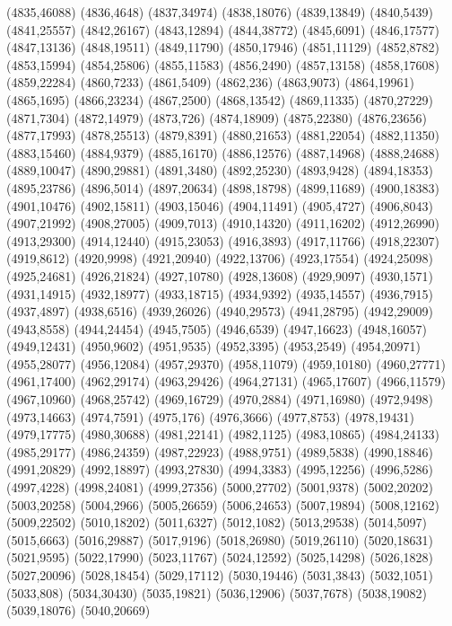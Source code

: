 (4835,46088)
(4836,4648)
(4837,34974)
(4838,18076)
(4839,13849)
(4840,5439)
(4841,25557)
(4842,26167)
(4843,12894)
(4844,38772)
(4845,6091)
(4846,17577)
(4847,13136)
(4848,19511)
(4849,11790)
(4850,17946)
(4851,11129)
(4852,8782)
(4853,15994)
(4854,25806)
(4855,11583)
(4856,2490)
(4857,13158)
(4858,17608)
(4859,22284)
(4860,7233)
(4861,5409)
(4862,236)
(4863,9073)
(4864,19961)
(4865,1695)
(4866,23234)
(4867,2500)
(4868,13542)
(4869,11335)
(4870,27229)
(4871,7304)
(4872,14979)
(4873,726)
(4874,18909)
(4875,22380)
(4876,23656)
(4877,17993)
(4878,25513)
(4879,8391)
(4880,21653)
(4881,22054)
(4882,11350)
(4883,15460)
(4884,9379)
(4885,16170)
(4886,12576)
(4887,14968)
(4888,24688)
(4889,10047)
(4890,29881)
(4891,3480)
(4892,25230)
(4893,9428)
(4894,18353)
(4895,23786)
(4896,5014)
(4897,20634)
(4898,18798)
(4899,11689)
(4900,18383)
(4901,10476)
(4902,15811)
(4903,15046)
(4904,11491)
(4905,4727)
(4906,8043)
(4907,21992)
(4908,27005)
(4909,7013)
(4910,14320)
(4911,16202)
(4912,26990)
(4913,29300)
(4914,12440)
(4915,23053)
(4916,3893)
(4917,11766)
(4918,22307)
(4919,8612)
(4920,9998)
(4921,20940)
(4922,13706)
(4923,17554)
(4924,25098)
(4925,24681)
(4926,21824)
(4927,10780)
(4928,13608)
(4929,9097)
(4930,1571)
(4931,14915)
(4932,18977)
(4933,18715)
(4934,9392)
(4935,14557)
(4936,7915)
(4937,4897)
(4938,6516)
(4939,26026)
(4940,29573)
(4941,28795)
(4942,29009)
(4943,8558)
(4944,24454)
(4945,7505)
(4946,6539)
(4947,16623)
(4948,16057)
(4949,12431)
(4950,9602)
(4951,9535)
(4952,3395)
(4953,2549)
(4954,20971)
(4955,28077)
(4956,12084)
(4957,29370)
(4958,11079)
(4959,10180)
(4960,27771)
(4961,17400)
(4962,29174)
(4963,29426)
(4964,27131)
(4965,17607)
(4966,11579)
(4967,10960)
(4968,25742)
(4969,16729)
(4970,2884)
(4971,16980)
(4972,9498)
(4973,14663)
(4974,7591)
(4975,176)
(4976,3666)
(4977,8753)
(4978,19431)
(4979,17775)
(4980,30688)
(4981,22141)
(4982,1125)
(4983,10865)
(4984,24133)
(4985,29177)
(4986,24359)
(4987,22923)
(4988,9751)
(4989,5838)
(4990,18846)
(4991,20829)
(4992,18897)
(4993,27830)
(4994,3383)
(4995,12256)
(4996,5286)
(4997,4228)
(4998,24081)
(4999,27356)
(5000,27702)
(5001,9378)
(5002,20202)
(5003,20258)
(5004,2966)
(5005,26659)
(5006,24653)
(5007,19894)
(5008,12162)
(5009,22502)
(5010,18202)
(5011,6327)
(5012,1082)
(5013,29538)
(5014,5097)
(5015,6663)
(5016,29887)
(5017,9196)
(5018,26980)
(5019,26110)
(5020,18631)
(5021,9595)
(5022,17990)
(5023,11767)
(5024,12592)
(5025,14298)
(5026,1828)
(5027,20096)
(5028,18454)
(5029,17112)
(5030,19446)
(5031,3843)
(5032,1051)
(5033,808)
(5034,30430)
(5035,19821)
(5036,12906)
(5037,7678)
(5038,19082)
(5039,18076)
(5040,20669)
